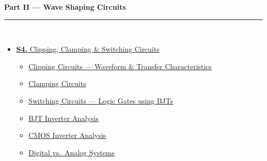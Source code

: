 \documentclass[12pt,a3paper]{article}
\begin{document}
\vspace{6pt}

\begin{tcolorbox}[breakable,colback=cB!5,colframe=cB,boxrule=1pt,arc=5pt,
  left=8pt,right=8pt,top=8pt,bottom=8pt,before skip=4pt]
  {\large\bfseries\textcolor{cB}{Part II --- Wave Shaping Circuits}}\\[5pt]
  \textcolor{cB!40}{\rule{\textwidth}{0.4pt}}\\[3pt]
  \small\begin{itemize}[leftmargin=1.2em,itemsep=1pt,label={\textcolor{cB}{$\triangleright$}}]
    \item \hyperref[sec:S4]{\textbf{S4.} Clipping, Clamping \& Switching Circuits}
      \begin{itemize}[leftmargin=1.5em,itemsep=0pt,label={\textcolor{cB}{$\cdot$}}]
        \item \hyperref[sub:s4-clipping]{Clipping Circuits --- Waveform \& Transfer Characteristics}
        \item \hyperref[sub:s4-clamping]{Clamping Circuits}
        \item \hyperref[sub:s4-switching]{Switching Circuits --- Logic Gates using BJTs}
        \item \hyperref[sub:s4-inverter]{BJT Inverter Analysis}
        \item \hyperref[sub:s4-cmos]{CMOS Inverter Analysis}
        \item \hyperref[sub:s4-digital]{Digital vs.\ Analog Systems}
      \end{itemize}
  \end{itemize}
\end{tcolorbox}

\vspace{6pt}
\end{document}
